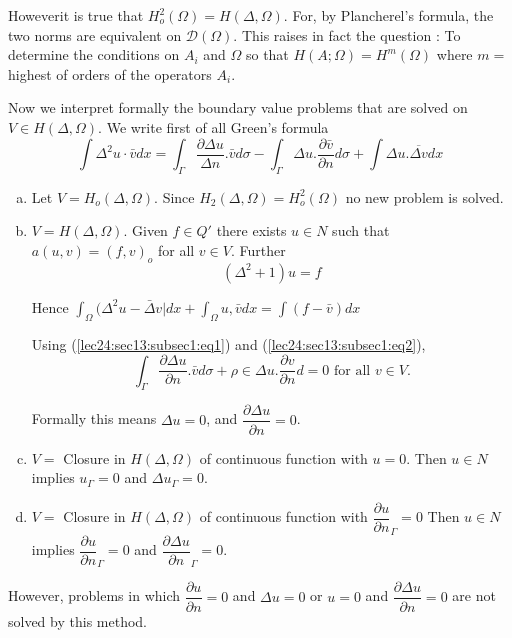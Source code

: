 However\pageoriginale it is true that $H^2_o (\Omega) = H(\Delta, \Omega)$. For, by
Plancherel's formula, the two norms are equivalent on
$\mathscr{D}(\Omega)$. This raises in fact the question : To determine
the conditions on $A_i$ and $\Omega$ so that $H(A; \Omega) = H^m
(\Omega)$ where $m=$ highest of orders of the operators $A_i$. 

Now we interpret formally the boundary value problems that are solved
on $V \in H(\Delta, \Omega)$. We write first of all Green's
formula 
\begin{equation}
  \int \Delta^2 u\cdot \bar{v} dx = \int_\Gamma \frac{\partial \Delta
    u}{\Delta n}. \bar{v} d \sigma - \int_\Gamma \Delta u
  . \frac{\partial \bar{v}}{\partial n} d \sigma + \int \Delta
  u. \overline{\Delta v} dx \tag{1}\label{lec24:sec13:subsec1:eq1} 
\end{equation}
\begin{enumerate}[a)]
\item Let $V = H_o (\Delta, \Omega)$. Since $H_2 (\Delta, \Omega) =
  H^2_o (\Omega)$ no new problem is solved. 
\item $V= H (\Delta, \Omega)$. Given $f \in Q'$ there exists
  $u \in N$ such that $a(u, v) = (f, v)_o$ for all $v
  \in V$. Further 
\begin{equation}
(\Delta^2 + 1)u = f \tag{2}\label{lec24:sec13:subsec1:eq2}
\end{equation}

Hence $\int_\Omega (\Delta^2 u - \bar{\Delta}v| dx + \int_\Omega u,
\bar{v} dx = \int (f- \bar{v})dx$ 

Using (\ref{lec24:sec13:subsec1:eq1}) and (\ref{lec24:sec13:subsec1:eq2}),
$$
\int_\Gamma \frac{\partial \Delta u}{\partial n}. \bar{v} d \sigma +
\rho \in  \Delta u. \frac{\partial v}{\partial n} d = 0 \text { for
  all } v \in V. 
$$

Formally this means $\Delta u = 0$, and $\dfrac{\partial \Delta
  u}{\partial n} = 0$. 
\item $V=$ Closure in $H(\Delta, \Omega)$ of continuous function with
  $u = 0$. Then $u \in N$ implies $u_\Gamma =0$ and $\Delta
  u_{\Gamma}=0$. 
\item $V=$ Closure in $H(\Delta, \Omega)$ of continuous function with
  $\dfrac{\partial u}{\partial n}_\Gamma = 0$ Then $u \in N$
  implies $\dfrac{\partial u}{\partial n}_\Gamma = 0$ and
  $\dfrac{\partial \Delta u}{\partial n}_\Gamma =0$. 
\end{enumerate}

However, problems in which $\dfrac{\partial u}{\partial n} = 0$ and
$\Delta u = 0$ or $u = 0$ and $\dfrac{\partial \Delta u}{\partial n} =
0$ are not solved by this method. 

